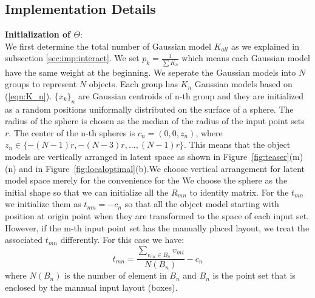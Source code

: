 \subsection{Implementation Details}
\textbf{Initialization of $\Theta$}:\\
We first determine the total number of Gaussian model $K_{all}$ as we explained in subsection \ref{sec:imp:interact}. We set $p_k=\frac{1}{\sum K_n}$ which means each Gaussian model have the same weight at the beginning. We seperate the Gaussian models into $N$ groups to represent $N$ objects. Each group has $K_n$ Gaussian models based on (\ref{equ:K_n}). $\{x_k\}_n$ are Gaussian centroids of n-th group and they are initialized as a random positions uniformally distributed on the surface of a sphere. The radius of the sphere is chosen as the median of the radius of the input point sets $r$. The center of the n-th spheres is $c_n=(0,0,z_n)$, where $z_n\in \{-(N-1)r,-(N-3)r,...,(N-1)r\}$. This means that the object models are vertically arranged in latent space as shown in Figure~\ref{fig:teaser}(m)(n) and in Figure~\ref{fig:localoptimal}(b).We choose vertical arrangement for latent model space merely for the convenience for the  We choose the sphere as the initial shape so that we can initialize all the $R_{mn}$ to identity matrix. For the $t_{mn}$ we initialize them as $t_{mn}=-c_n$ so that all the object model starting with position at origin point when they are transformed to the space of each input set. However, if the m-th input point set has the manually placed layout, we treat the associated $t_{mn}$ differently. For this case we have:
\begin{equation}
\label{equ:initt}
t_{mn}=\frac{\sum_{v_{mi} \in B_n}v_{mi}}{N(B_n)}-c_n
\end{equation}
where $N(B_n)$ is the number of element in $B_n$ and $B_n$ is the point set that is enclosed by the mannual input layout (boxes). 
